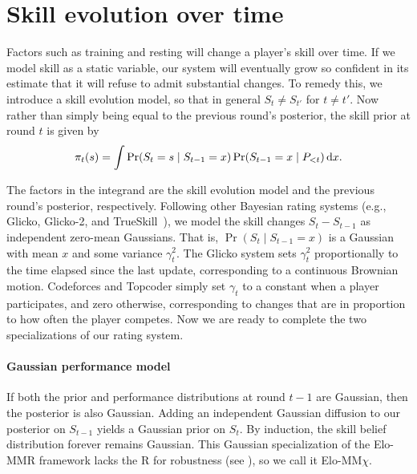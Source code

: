 \section{Skill evolution over time}
\label{sec:skill-drift}

Factors such as training and resting will change a player's skill over time. If we model skill as a static variable, our system will eventually grow so confident in its estimate that it will refuse to admit substantial changes. To remedy this, we introduce a skill evolution model, so that in general $S_t \neq S_{t'}$ for $t \neq t'$. Now rather than simply being equal to the previous round's posterior, the skill prior at round $t$ is given by
\begin{equation}
\label{eq:drift}
\pi_t(s) = \int \Pr(S_t = s \mid S_{t-1} = x) \Pr(S_{t-1} = x \mid P_{<t}) \,\mathrm{d}x.
\end{equation}

The factors in the integrand are the skill evolution model and the previous round's posterior, respectively. Following other Bayesian rating systems (e.g., Glicko, Glicko-2, and TrueSkill~\cite{G99, G12, HMG06}), we model the skill changes $S_t-S_{t-1}$ as independent zero-mean Gaussians. That is, $\Pr(S_t \mid S_{t-1}=x)$ is a Gaussian with mean $x$ and some variance $\gamma_t^2$. The Glicko system sets $\gamma_t^2$ proportionally to the time elapsed since the last update, corresponding to a continuous Brownian motion. Codeforces and Topcoder simply set $\gamma_t$ to a constant when a player participates, and zero otherwise, corresponding to changes that are in proportion to how often the player competes. Now we are ready to complete the two specializations of our rating system.

\paragraph{Gaussian performance model}
If both the prior and performance distributions at round $t-1$ are Gaussian, then the posterior is also Gaussian. Adding an independent Gaussian diffusion to our posterior on $S_{t-1}$ yields a Gaussian prior on $S_t$. By induction, the skill belief distribution forever remains Gaussian. This Gaussian specialization of the Elo-MMR framework lacks the R for robustness (see ), so we call it Elo-MM$\chi$.

